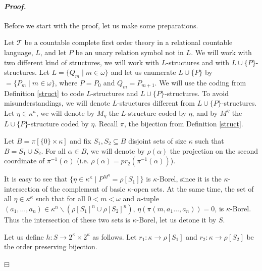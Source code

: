 \documentclass[12pt,a4paper]{amsart}
\theoremstyle{definition}
\theoremstyle{remark}
\renewcommand{\mid}{\mathrel{|}\allowbreak}
\newenvironment{cproof}{\paragraph{\emph{Proof.\,}}}{\hfill{$\boxminus$}\par\vspace{2mm}}
\begin{document}
\begin{cproof} 

Before we start with the proof, let us make some preparations.

Let $\mathcal{T}$ be a countable complete first order theory in a relational countable language, $L$, and let $P$ be an unary relation symbol not in $L$. 
We will work with two different kind of structures, we will work with $L$-structures and with $L\cup\{P\}$-structures. Let $L=\{Q_m\mid m\in\omega\}$ and let us enumerate $L\cup\{P\}$ by $=\{P_m\mid m\in\omega\}$, where $P=P_0$ and $Q_m=P_{m+1}$. We will use the coding from Definition \ref{struct} to code $L$-structures and $L\cup\{P\}$-structures. To avoid misunderstandings, we will denote $L$-structures different from $L\cup \{P\}$-structures. Let $\eta\in \kappa^\kappa$, we will denote by $M_\eta$ the $L$-structure coded by $\eta$, and by $M^\eta$ the $L\cup \{P\}$-structure coded by $\eta$. Recall $\pi$, the bijection from Definition \ref{struct}.

Let $B=\pi[\{0\}\times \kappa]$ and fix $S_1,S_2\subseteq B$ disjoint sets of size $\kappa$ such that $B=S_1\cup S_2$. For all $\alpha\in B$, we will denote by $\rho(\alpha)$ the projection on the second coordinate of $\pi^{-1}(\alpha)$ (i.e. $\rho(\alpha)=pr_2(\pi^{-1}(\alpha))$).

It is easy to see that $\{\eta\in \kappa^\kappa\mid P^{M^{\eta}}=\rho[S_1]\}$ is $\kappa$-Borel, since it is the $\kappa$-intersection of the complement of basic $\kappa$-open sets. At the same time, the set of all $\eta\in \kappa^\kappa$ such that for all $0<m<\omega$ and $n$-tuple $(a_1,\ldots, a_n)\in \kappa^n\backslash (\rho[S_1]^n \cup \rho[S_2]^n)$, $\eta(\pi(m,a_1\ldots,a_n))=0$, is $\kappa$-Borel. Thus the intersection of these two sets is $\kappa$-Borel, let us detone it by $S$.

Let us define $h:S\rightarrow 2^\kappa\times 2^\kappa$ as follows. Let $r_1:\kappa\rightarrow \rho[S_1]$ and $r_2:\kappa\rightarrow \rho[S_2]$ be the order preserving bijection. %


\end{cproof}
\end{document}
